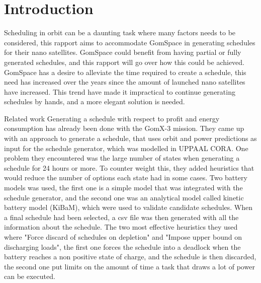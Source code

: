 \chapter{Introduction}\label{cha:intro}
Scheduling in orbit can be a daunting task where many factors needs to be considered, this rapport aims to accommodate GomSpace in generating schedules for their nano satellites. GomSpace could benefit from having partial or fully generated schedules, and this rapport will go over how this could be achieved. GomSpace has a desire to alleviate the time required to create a schedule, this need has increased over the years since the amount of launched nano satellites have increased. This trend have made it impractical to continue generating schedules by hands, and a more elegant solution is needed.

Related work %
Generating a schedule with respect to profit and energy consumption has already been done with the GomX-3 mission. They came up with an approach to generate a schedule, that uses orbit and power predictions as input for the schedule generator, which was modelled in UPPAAL CORA. One problem they encountered was the large number of states when generating a schedule for 24 hours or more. To counter weight this, they added heuristics that would reduce the number of options each state had in some cases. Two battery models was used, the first one is a simple model that was integrated with the schedule generator, and the second one was an analytical model called kinetic battery model (KiBaM), which were used to validate candidate schedules. When a final schedule had been selected, a csv file was then generated with all the information about the schedule. The two most effective heuristics they used where "Force discard of schedules on depletion" and "Impose upper bound on discharging loads", the first one forces the schedule into a deadlock when the battery reaches a non positive state of charge, and the schedule is then discarded, the second one put limits on the amount of time a task that draws a lot of power can be executed.%

